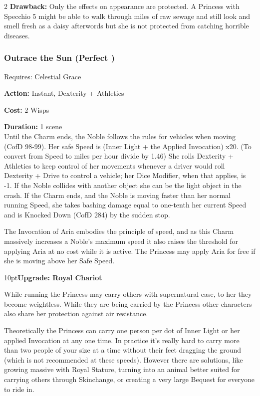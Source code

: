 \begin{multicols}{2}
\textbf{Drawback:} Only the effects on appearance are protected. A Princess with Specchio 5 might be able to walk through miles of raw sewage and still look and smell fresh as a daisy afterwords but she is not protected from catching horrible diseases.

\subsubsection*{Outrace the Sun (Perfect \textbullet\textbullet\textbullet)}

\noindent Requires: Celestial Grace

\noindent \textbf{Action:} Instant, Dexterity + Athletics

\noindent \textbf{Cost:} 2 Wisps

\noindent \textbf{Duration:} 1 scene \\

\noindent Until the Charm ends, the Noble follows the rules for vehicles when moving (CofD 98-99). Her safe Speed is (Inner Light + the Applied Invocation) x20. (To convert from Speed to miles per hour divide by 1.46)  She rolls Dexterity + Athletics to keep control of her movements whenever a driver would roll Dexterity + Drive to control a vehicle; her Dice Modifier, when that applies, is -1. If the Noble collides with another object she can be the light object in the crash. If the Charm ends, and the Noble is moving faster than her normal running Speed, she takes bashing damage equal to one-tenth her current Speed and is Knocked Down (CofD 284) by the sudden stop.

The Invocation of Aria embodies the principle of speed, and as this Charm massively increases a Noble's maximum speed it also raises the threshold for applying Aria at no cost while it is active. The Princess may apply Aria for free if she is moving above her Safe Speed. 

\begin{myindentpar}{10pt}\textbf{Upgrade: Royal Chariot}

While running the Princess may carry others with supernatural ease, to her they become weightless. While they are being carried by the Princess other characters also share her protection against air resistance.

Theoretically the Princess can carry one person per dot of Inner Light or her applied Invocation at any one time. In practice it's really hard to carry more than two people of your size at a time without their feet dragging the ground (which is not recommended at these speeds). However there are solutions, like growing massive with Royal Stature, turning into an animal better suited for carrying others through Skinchange, or creating a very large Bequest for everyone to ride in. 


\end{myindentpar}
\end{multicols}
